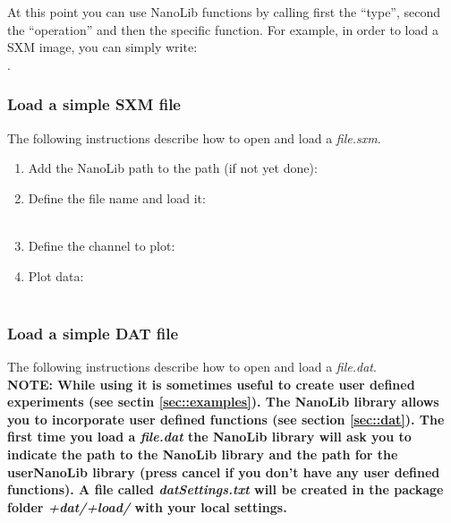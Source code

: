 At this point you can use NanoLib functions by calling first the ``type'', second the ``operation'' and then the specific function. For example, in order to load a SXM image, you can simply write: \\
.

\newpage

\subsubsection{Load a simple SXM file}

The following instructions describe how to open and load a \emph{file.sxm}.

\begin{enumerate}
	\item Add the NanoLib path to the \matlab{} path (if not yet done):\\

	\item Define the file name and load it:\\
	\\
	
	\item Define the channel to plot:\\

	\item Plot data:\\
	\\
	
\end{enumerate}

\subsubsection{Load a simple DAT file}

The following instructions describe how to open and load a \emph{file.dat}. \\

\noindent \textbf{NOTE: While using \nanonis{} it is sometimes useful to create user defined experiments (see sectin \ref{sec::examples}). The NanoLib library allows you to incorporate user defined functions (see section \ref{sec::dat}). The first time you load a \emph{file.dat} the NanoLib library will ask you to indicate the path to the NanoLib library and the path for the userNanoLib library (press cancel if you don't have any user defined functions). A file called \emph{datSettings.txt} will be created in the package folder \emph{+dat/+load/} with your local settings.
}

